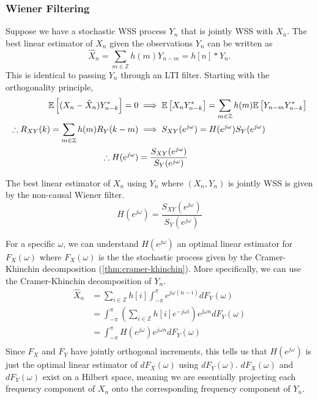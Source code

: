 \subsubsection{Wiener Filtering}
Suppose we have a stochastic WSS process $Y_n$ that is jointly WSS with $X_n$.
The best linear estimator of $X_n$ given the observations $Y_n$ can be written as \[
	\hat{X}_n = \sum_{m\in\mathbb{Z}}h(m)Y_{n-m} = h[n] * Y_n.
\]
This is identical to passing $Y_n$ through an LTI filter.
Starting with the orthogonality principle,
\begin{align*}
	\mathbb{E}\left[(X_n-\hat{X}_n)Y_{n-k}^*\right] = 0 &\implies \mathbb{E}\left[X_nY^*_{n-k}\right] = \sum_{m\in\mathbb{Z}}h(m)\mathbb{E}\left[Y_{n-m}Y^*_{n-k}\right]\\
	\therefore R_{XY}(k) = \sum_{m\in\mathbb{Z}}h(m)R_Y(k-m) &\implies S_{XY}(e^{j\omega}) = H(e^{j\omega})S_Y(e^{j\omega})\\
	\therefore H(e^{j\omega}) &= \frac{S_{XY}(e^{j\omega})}{S_Y(e^{j\omega})}
\end{align*}
\begin{definition}
	The best linear estimator of $X_n$ using $Y_n$ where $(X_n, Y_n)$ is jointly WSS is given by the non-causal Wiener filter.
	\[
		H(e^{j\omega}) = \frac{S_{XY}(e^{j\omega})}{S_Y(e^{j\omega})}
	\]
	\label{defn:noncausal-wiener}
\end{definition}
For a specific $\omega$, we can understand $H(e^{j\omega})$ an optimal linear estimator for $F_X(\omega)$ where $F_X(\omega)$ is the the stochastic process given by the Cramer-Khinchin decomposition (\cref{thm:cramer-khinchin}).
More specifically, we can use the Cramer-Khinchin decomposition of $Y_n$.
\begin{align*}
	\hat{X}_n &= \sum_{i\in\mathbb{Z}}h[i]\int_{-\pi}^\pi e^{j\omega(n-i)}dF_Y(\omega)\\
	&= \int_{-\pi}^{\pi}\left(\sum_{i\in\mathbb{Z}}h[i]e^{-j\omega i}\right)e^{j\omega n}dF_Y(\omega) \\
	&= \int_{-\pi}^\pi H(e^{j\omega})e^{j\omega n}dF_Y(\omega)\\
\end{align*}
Since $F_X$ and $F_Y$ have jointly orthogonal increments, this tells us that $H(e^{j\omega})$ is just the optimal linear estimator of $dF_X(\omega)$ using $dF_Y(\omega)$.
$dF_X(\omega)$ and $dF_Y(\omega)$ exist on a Hilbert space, meaning we are essentially projecting each frequency component of $X_n$ onto the corresponding frequency component of $Y_n$.


